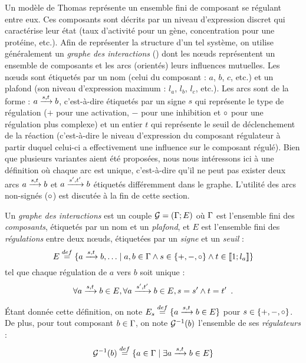 Un modèle de Thomas représente un ensemble fini de composant se régulant entre eux.
Ces composants sont décrits par un niveau d'expression discret qui
caractérise leur état (taux d'activité pour un gène, concentration pour une protéine, etc.).
Afin de représenter la structure d'un tel système,
on utilise généralement un \emph{graphe des interactions} ()
dont les nœuds représentent un ensemble de composants
et les arcs (orientés) leurs influences mutuelles.
Les nœuds sont étiquetés par un nom (celui du composant : $a$, $b$, $c$, etc.)
et un plafond (son niveau d'expression maximum : $l_a$, $l_b$, $l_c$, etc.).
Les arcs sont de la forme : $a \xrightarrow{s, t} b$,
c'est-à-dire étiquetés par un signe $s$ qui représente le type de régulation
($+$ pour une activation, $-$ pour une inhibition
et $\circ$ pour une régulation plus complexe)
et un entier $t$ qui représente le seuil de déclenchement de la réaction
(c'est-à-dire le niveau d'expression du composant régulateur à partir duquel celui-ci
a effectivement une influence sur le composant régulé).
Bien que plusieurs variantes aient été proposées,
nous nous intéressons ici à une définition où
chaque arc est unique, c'est-à-dire qu'il ne peut pas exister deux arcs
$a \xrightarrow{s, t} b$ et $a \xrightarrow{s', t'} b$ étiquetés différemment dans le graphe.
L'utilité des arcs non-signés ($\circ$) est discutée à la fin de cette section.

\begin{definition}
  Un \emph{graphe des interactions} est un couple $\mathcal{G} = (\mathrm{\Gamma}; E)$ où
  $\mathrm{\Gamma}$ est l'ensemble fini des \emph{composants},
  étiquetés par un nom et un \emph{plafond},
  et $E$ est l'ensemble fini des \emph{régulations} entre deux nœuds,
  étiquetées par un \emph{signe} et un \emph{seuil} :
    \[E \stackrel{def}= \{ a \xrightarrow{s, t} b, \ldots \mid
      a, b \in \mathrm{\Gamma} \wedge s \in \{ +, -, \circ \} \wedge t \in \mathopen{\llbracket}1\mathclose{};l_a\mathclose{\rrbracket}\}\]
  tel que chaque régulation de $a$ vers $b$ soit unique :
    \[\forall a \xrightarrow{s, t} b \in E,
      \forall a \xrightarrow{s', t'} b \in E, s = s' \wedge t = t' \enspace.\]
\end{definition}
%
Étant donnée cette définition, on note
$E_s \stackrel{def}= \{ a \xrightarrow{s, t} b \in E \}$ pour $s \in \{ +, -, \circ \}$.
De plus, pour tout composant $b \in \mathrm{\Gamma}$, on note $\mathcal{G}^{-1}(b)$ l'ensemble de ses
\emph{régulateurs} :
    \[\mathcal{G}^{-1}(b) \stackrel{def}= \{ a \in \mathrm{\Gamma} \mid \exists a \xrightarrow{s, t} b \in E \}\]
\label{regulateurs}

